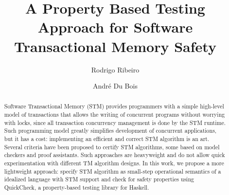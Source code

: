\documentclass[sigplan]{acmart}
\theoremstyle{definition}
\begin{document}
\title{A Property Based Testing Approach for Software Transactional Memory Safety}

\author{Rodrigo Ribeiro}

\author{Andr\'e Du Bois}

\begin{abstract}
Software Transactional Memory (STM) provides programmers with a simple high-level model of transactions that allows the
writing of concurrent programs without worrying with locks, since all transaction concurrency management is done by
the STM runtime. Such programming model greatly simplifies development of concurrent applications, but it has a cost:
implementing an efficient and correct STM algorithm is an art. Several criteria have been proposed to certify
STM algorithms, some based on model checkers and proof assistants. Such approaches are heavyweight and
do not allow quick experimentation with different TM algorithm designs. In this work, we propose a more
lightweight approach: specify STM algorithm as small-step operational semantics of a idealized language with
STM support and check for safety properties using QuickCheck, a property-based testing library for Haskell.
\end{abstract}
\end{document}
